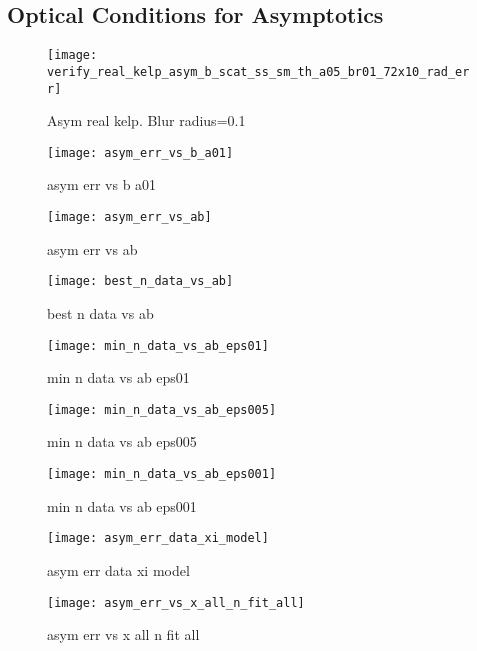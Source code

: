 \subsection{Optical Conditions for Asymptotics}

\begin{figure}[H]
  \centering
  \texttt{[image: verify\_real\_kelp\_asym\_b\_scat\_ss\_sm\_th\_a05\_br01\_72x10\_rad\_err]}
  \caption{Asym real kelp. Blur radius=0.1}
  \label{fig:asym_real_kelp_br01}
\end{figure}


\begin{figure}[H]
  \centering
  \texttt{[image: asym\_err\_vs\_b\_a01]}
  \caption{asym err vs b a01}
  \label{fig:asym_err_vs_b_a01}
\end{figure}

\begin{figure}[H]
  \centering
  \texttt{[image: asym\_err\_vs\_ab]}
  \caption{asym err vs ab}
  \label{fig:asym_err_vs_ab}
\end{figure}

\begin{figure}[H]
  \centering
  \texttt{[image: best\_n\_data\_vs\_ab]}
  \caption{best n data vs ab}
  \label{fig:best_n_data_vs_ab}
\end{figure}

\begin{figure}[H]
  \centering
  \texttt{[image: min\_n\_data\_vs\_ab\_eps01]}
  \caption{min n data vs ab eps01}
  \label{fig:min_n_data_vs_ab_eps01}
\end{figure}

\begin{figure}[H]
  \centering
  \texttt{[image: min\_n\_data\_vs\_ab\_eps005]}
  \caption{min n data vs ab eps005}
  \label{fig:min_n_data_vs_ab_eps005}
\end{figure}

\begin{figure}[H]
  \centering
  \texttt{[image: min\_n\_data\_vs\_ab\_eps001]}
  \caption{min n data vs ab eps001}
  \label{fig:min_n_data_vs_ab_eps001}
\end{figure}

\begin{figure}[H]
  \centering
  \texttt{[image: asym\_err\_data\_xi\_model]}
  \caption{asym err data xi model}
  \label{fig:asym_err_data_xi_model}
\end{figure}

\begin{figure}[H]
  \centering
  \texttt{[image: asym\_err\_vs\_x\_all\_n\_fit\_all]}
  \caption{asym err vs x all n fit all}
  \label{fig:asym_err_vs_x_all_n_fit_all}
\end{figure}

